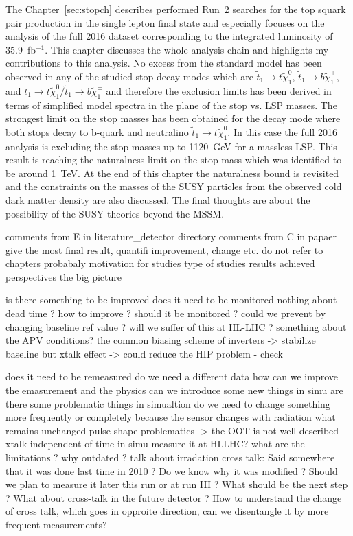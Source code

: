 The Chapter~\ref{sec:stopch} describes performed Run~2 searches for the top squark pair production in the single lepton final state and especially focuses on the analysis of the full 2016 dataset corresponding to the integrated luminosity of 35.9~fb$^{-1}$. This chapter discusses the whole analysis chain and highlights my contributions to this analysis. No excess from the standard model has been observed in any of the studied stop decay modes which are $\tilde{t}_{1} \to t  \tilde{\chi}^{0}_{1} $, $\tilde{t}_{1} \to b  \tilde{\chi}^{\pm}_{1}$, and $ \tilde{t}_{1} \to t  \tilde{\chi}^{0}_{1}/\tilde{t}_{1} \to b  \tilde{\chi}^{\pm}_{1} $ and therefore the exclusion limits has been derived in terms of simplified model spectra in the plane of the stop vs. LSP masses. The strongest limit on the stop masses has been obtained for the decay mode where both stops decay to b-quark and neutralino $\tilde{t}_{1} \to t  \tilde{\chi}^{0}_{1}$. In this case the full 2016 analysis is excluding the stop masses up to 1120~GeV for a massless LSP. This result is reaching the naturalness limit on the stop mass which was identified to be around 1~TeV. At the end of this chapter the naturalness bound is revisited and the constraints on the masses of the SUSY particles from the observed cold dark matter density are also discussed. The final thoughts are about the possibility of the SUSY theories beyond the MSSM.

comments from E in literature_detector directory
comments from C in papaer
give the most final result, quantifi improvement, change etc.
do not refer to chapters probabaly
motivation for studies
type of studies
results achieved
perspectives
the big picture


is there something to be improved
does it need to be monitored
nothing about dead time ?
how to improve ?
should it be monitored ?
could we prevent by changing baseline ref value ?
will we suffer of this at HL-LHC ?
something about the APV conditions?
the common biasing scheme of inverters -> stabilize baseline but xtalk effect -> could reduce the HIP problem - check 


does it need to be remeasured
do we need a different data
how can we improve the emasurement and the physics
can we introduce some new things in simu
are there some problematic things in simualtion
do we need to change something more frequently or completely because the sensor changes with radiation
what remains unchanged
pulse shape problematics -> the OOT is not well described
xtalk independent of time in simu
measure it at HLLHC?
what are the limitations ?
why outdated ? talk about irradation
cross talk: Said somewhere that it was done last time in 2010 ?
Do we know why it was modified ?
Should we plan to measure it later this run or at run III ?
What should be the next step ?
What about cross-talk in the future detector ?
How to understand the change of cross talk, which goes in opproite direction, can we disentangle it by more frequent measurements?


